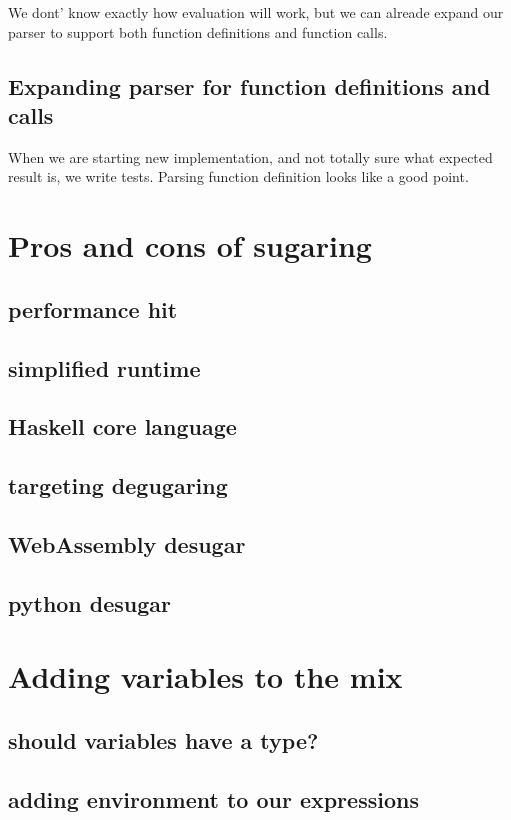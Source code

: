 \documentclass[11pt]{article}
\begin{document}
We dont' know exactly how evaluation will work, but we can alreade expand our parser to support both function definitions and function calls.
\subsection{Expanding parser for function definitions and calls}
\label{sec:orge301356}
When we are starting new implementation, and not totally sure what expected result is, we write tests.
Parsing function definition looks like a good point.


\section{Pros and cons of sugaring}
\label{sec:orga3409e2}
\subsection{performance hit}
\label{sec:org83d4080}
\subsection{simplified runtime}
\label{sec:org6014a77}
\subsection{Haskell core language}
\label{sec:orgdfad20f}
\subsection{targeting degugaring}
\label{sec:org43fb042}
\subsection{WebAssembly desugar}
\label{sec:orgb9baf86}
\subsection{python desugar}
\label{sec:org138e88a}

\section{Adding variables to the mix}
\label{sec:orge9d6d0a}
\subsection{should variables have a type?}
\label{sec:orge535017}
\subsection{adding environment to our expressions}
\label{sec:orgf0bcde1}
\end{document}
